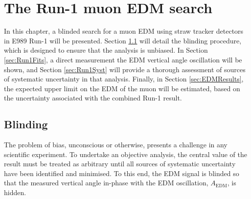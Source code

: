 \chapter{The Run-1 muon EDM search}\label{chap:6}

In this chapter, a blinded search for a muon EDM using straw tracker detectors in E989 Run-1 will be presented. Section \ref{sec:Blinding} will detail the blinding procedure, which is designed to ensure that the analysis is unbiased. In Section \ref{sec:Run1Fits}, a direct measurement the EDM vertical angle oscillation will be shown, and Section \ref{sec:Run1Syst} will provide a thorough assessment of sources of systematic uncertainty in that analysis. Finally, in Section \ref{sec:EDMResults}, the expected upper limit on the EDM of the muon will be estimated, based on the uncertainty associated with the combined Run-1 result.

\section{Blinding}\label{sec:Blinding}

The problem of bias, unconscious or otherwise, presents a challenge in any scientific experiment. To undertake an objective analysis, the central value of the result must be treated as arbitrary until all sources of systematic uncertainty have been identified and minimised. To this end, the EDM signal is blinded so that the measured vertical angle in-phase with the EDM oscillation, $A_{\text{EDM}}$, is hidden. 

